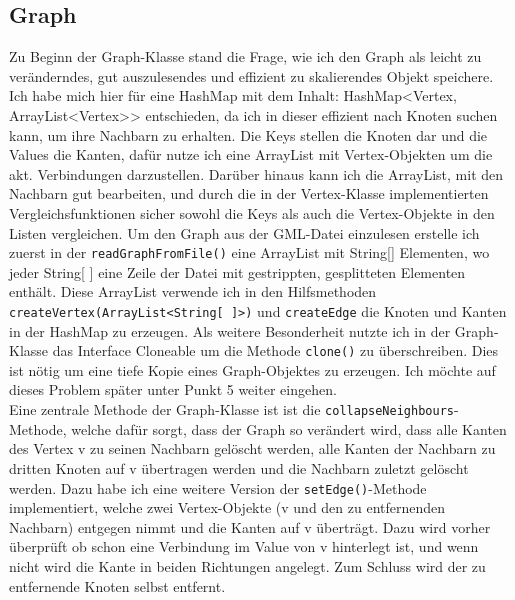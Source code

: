 \documentclass[12pt,a4paper]{article}
\begin{document}
\subsection{Graph}
Zu Beginn der Graph-Klasse stand die Frage, wie ich den Graph als leicht zu veränderndes, gut auszulesendes und effizient zu skalierendes Objekt speichere. Ich habe mich hier für eine HashMap mit dem Inhalt: HashMap<Vertex, ArrayList<Vertex>> entschieden, da ich in dieser effizient nach Knoten suchen kann, um ihre Nachbarn zu erhalten. Die Keys stellen die Knoten dar und die Values die Kanten, dafür nutze ich eine ArrayList mit Vertex-Objekten um die akt. Verbindungen darzustellen. Darüber hinaus kann ich die ArrayList, mit den Nachbarn gut bearbeiten, und durch die in der Vertex-Klasse implementierten Vergleichsfunktionen sicher sowohl die Keys als auch die Vertex-Objekte in den Listen vergleichen. Um den Graph aus der GML-Datei einzulesen erstelle ich zuerst in der \texttt{readGraphFromFile()} eine ArrayList mit String[] Elementen, wo jeder String[ ] eine Zeile der Datei mit gestrippten, gesplitteten Elementen enthält. Diese ArrayList verwende ich in den Hilfsmethoden \texttt{createVertex(ArrayList<String[ ]>)} und \texttt{createEdge} die Knoten und Kanten in der HashMap zu erzeugen. Als weitere Besonderheit nutzte ich in der Graph-Klasse das Interface \glqq Cloneable\grqq{} um die Methode \texttt{clone()} zu überschreiben. Dies ist nötig um eine tiefe Kopie eines Graph-Objektes zu erzeugen. Ich möchte auf dieses Problem später unter Punkt 5 weiter eingehen. \\
Eine zentrale Methode der Graph-Klasse ist ist die \texttt{collapseNeighbours}-Methode, welche dafür sorgt, dass der Graph so verändert wird, dass alle Kanten des Vertex v zu seinen Nachbarn gelöscht werden, alle Kanten der Nachbarn zu dritten Knoten auf v übertragen werden und die Nachbarn zuletzt gelöscht werden. Dazu habe ich eine weitere Version der \texttt{setEdge()}-Methode implementiert, welche zwei Vertex-Objekte (v und den zu entfernenden Nachbarn) entgegen nimmt und die Kanten auf v überträgt. Dazu wird vorher überprüft ob schon eine Verbindung im Value von v hinterlegt ist, und wenn nicht wird die Kante in beiden \glqq Richtungen\grqq{} angelegt. Zum Schluss wird der zu entfernende Knoten selbst entfernt. 
\end{document}
